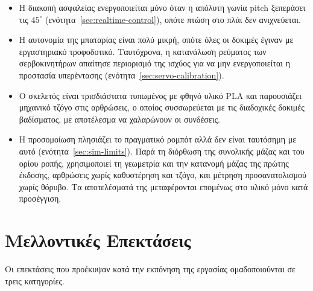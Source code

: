 \documentclass[11pt]{report}
\begin{document}
\begin{itemize}
  \item Η διακοπή ασφαλείας ενεργοποιείται μόνο όταν η απόλυτη γωνία pitch
  ξεπεράσει τις $45^\circ$ (ενότητα~\ref{sec:realtime-control}), οπότε πτώση στο
  πλάι δεν ανιχνεύεται.
  \item Η αυτονομία της μπαταρίας είναι πολύ μικρή, οπότε όλες οι δοκιμές
  έγιναν με εργαστηριακό τροφοδοτικό. Ταυτόχρονα, η κατανάλωση ρεύματος των
  σερβοκινητήρων απαίτησε περιορισμό της ισχύος για να μην ενεργοποιείται η
  προστασία υπερέντασης (ενότητα~\ref{sec:servo-calibration}).
  \item Ο σκελετός είναι τρισδιάστατα τυπωμένος με φθηνό υλικό PLA και
  παρουσιάζει μηχανικό τζόγο στις αρθρώσεις, ο οποίος συσσωρεύεται με τις
  διαδοχικές δοκιμές βαδίσματος, με αποτέλεσμα να χαλαρώνουν οι συνδέσεις.
  \item Η προσομοίωση πλησιάζει το πραγματικό ρομπότ αλλά δεν είναι ταυτόσημη
  με αυτό (ενότητα~\ref{sec:sim-limits}). Παρά τη διόρθωση της συνολικής μάζας
  και του ορίου ροπής, χρησιμοποιεί τη γεωμετρία και την κατανομή μάζας της
  πρώτης έκδοσης, αρθρώσεις χωρίς καθυστέρηση και τζόγο, και μέτρηση
  προσανατολισμού χωρίς θόρυβο. Τα αποτελέσματά της μεταφέρονται επομένως στο
  υλικό μόνο κατά προσέγγιση.
\end{itemize}

\section{Μελλοντικές Επεκτάσεις}
\label{sec:future-work}
Οι επεκτάσεις που προέκυψαν κατά την εκπόνηση της εργασίας ομαδοποιούνται σε
τρεις κατηγορίες.
\end{document}
